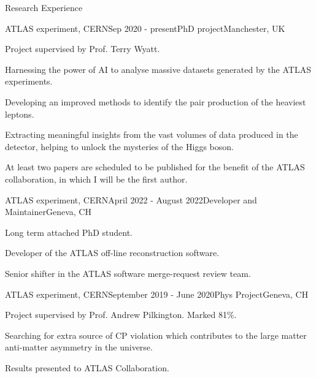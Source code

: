 \documentclass{resume} %
\begin{document}
    \begin{rSection}{Research Experience}
        \begin{rSubsection}{ATLAS experiment, CERN}{Sep 2020 - present}{PhD project}{Manchester, UK}
            \item Project supervised by Prof. Terry Wyatt.
            \item Harnessing the power of AI to analyse massive datasets generated by the ATLAS experiments. 
            \item Developing an improved methods to identify the pair production of the heaviest leptons.
            \item Extracting meaningful insights from the vast volumes of data produced in the detector, helping to unlock the mysteries of the Higgs boson.
            \item At least two papers are scheduled to be published for the benefit of the ATLAS collaboration, in which I will be the first author.
        \end{rSubsection}
        \begin{rSubsection}{ATLAS experiment, CERN}{April 2022 - August 2022}{Developer and Maintainer}{Geneva, CH}
            \item Long term attached PhD student.
            \item Developer of the ATLAS off-line reconstruction software.
            \item Senior shifter in the ATLAS software merge-request review team.
        \end{rSubsection}
        \begin{rSubsection}{ATLAS experiment, CERN}{September 2019 - June 2020}{Phys Project}{Geneva, CH}
            \item   Project supervised by Prof. Andrew Pilkington. Marked 81\%.
            \item   Searching for extra source of CP violation which contributes to the large matter anti-matter asymmetry in the universe.
            \item   Results presented to ATLAS Collaboration. 
        \end{rSubsection}
    \end{rSection}
\end{document}
